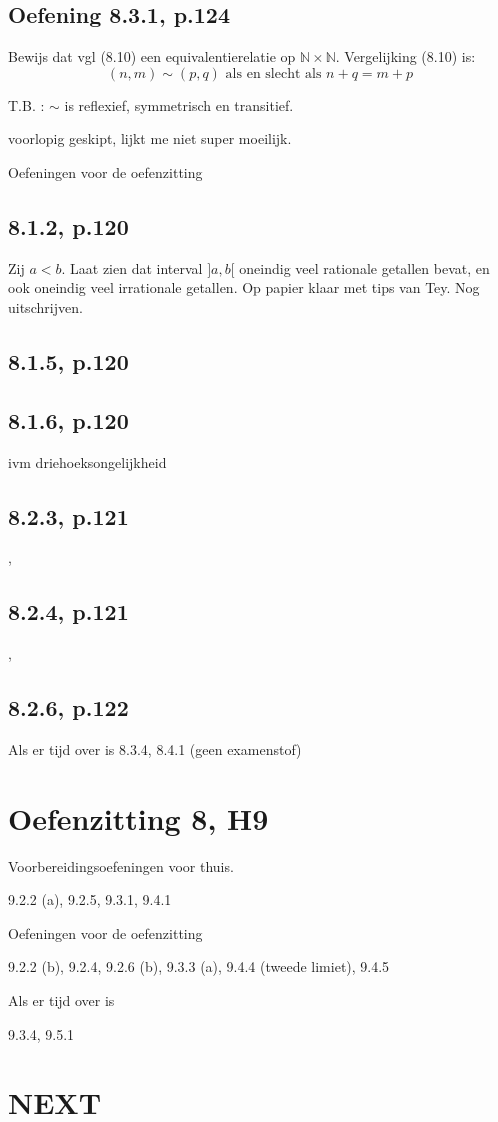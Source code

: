 \documentclass{article}
\begin{document}
\subsection{Oefening 8.3.1, p.124}  
Bewijs dat vgl (8.10) een equivalentierelatie op $\mathbb{N} \times \mathbb{N}$. Vergelijking (8.10) is: \[
(n,m) \sim (p,q) \text{ als en slecht als } n+q=m+p
\]

T.B. : $\sim$ is reflexief, symmetrisch en transitief. 

voorlopig geskipt, lijkt me niet super moeilijk. 



Oefeningen voor de oefenzitting 

\subsection{8.1.2, p.120}
Zij $a<b$. Laat zien dat interval $] a,b[ $ oneindig veel rationale getallen bevat, en ook oneindig veel irrationale getallen. 
Op papier klaar met tips van Tey. Nog uitschrijven. 
 
\subsection{8.1.5, p.120}
 
\subsection{8.1.6, p.120}
ivm driehoeksongelijkheid

\subsection{8.2.3, p.121}
, 
\subsection{8.2.4, p.121}
, 
\subsection{8.2.6, p.122}
 

Als er tijd over is  8.3.4, 8.4.1 (geen examenstof) 


\section{Oefenzitting 8, H9}

Voorbereidingsoefeningen voor thuis.

9.2.2 (a), 9.2.5, 9.3.1, 9.4.1  

Oefeningen voor de oefenzitting 

 9.2.2 (b), 9.2.4, 9.2.6 (b), 9.3.3 (a), 9.4.4 (tweede limiet), 9.4.5 

 Als er tijd over is 

9.3.4, 9.5.1

\section*{NEXT}
\end{document}
